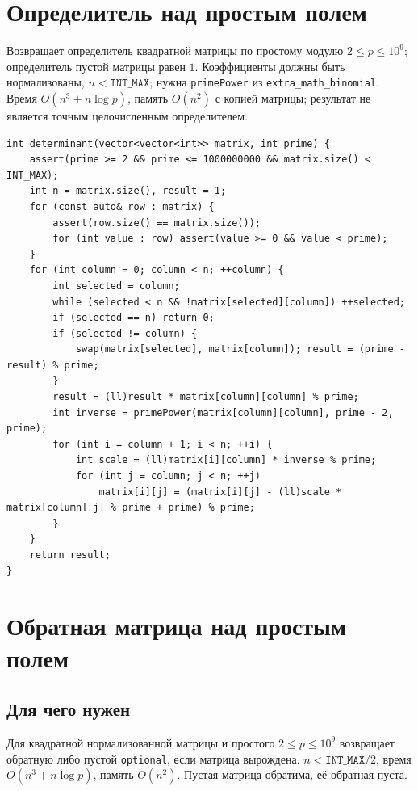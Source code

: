 \section{Определитель над простым полем}
Возвращает определитель квадратной матрицы по простому модулю $2\le p\le10^9$; определитель пустой матрицы равен $1$.
Коэффициенты должны быть нормализованы, $n<\texttt{INT\_MAX}$; нужна \texttt{primePower} из \texttt{extra\_math\_binomial}.
Время $O(n^3+n\log p)$, память $O(n^2)$ с копией матрицы; результат не является точным целочисленным определителем.
\begin{lstlisting}[name=extra_math_determinant]
int determinant(vector<vector<int>> matrix, int prime) {
    assert(prime >= 2 && prime <= 1000000000 && matrix.size() < INT_MAX);
    int n = matrix.size(), result = 1;
    for (const auto& row : matrix) {
        assert(row.size() == matrix.size());
        for (int value : row) assert(value >= 0 && value < prime);
    }
    for (int column = 0; column < n; ++column) {
        int selected = column;
        while (selected < n && !matrix[selected][column]) ++selected;
        if (selected == n) return 0;
        if (selected != column) {
            swap(matrix[selected], matrix[column]); result = (prime - result) % prime;
        }
        result = (ll)result * matrix[column][column] % prime;
        int inverse = primePower(matrix[column][column], prime - 2, prime);
        for (int i = column + 1; i < n; ++i) {
            int scale = (ll)matrix[i][column] * inverse % prime;
            for (int j = column; j < n; ++j)
                matrix[i][j] = (matrix[i][j] - (ll)scale * matrix[column][j] % prime + prime) % prime;
        }
    }
    return result;
}
\end{lstlisting}
%

\iffalse
\section{Обратная матрица над простым полем}
\subsection*{Для чего нужен}
Для квадратной нормализованной матрицы и простого $2\le p\le10^9$
возвращает обратную либо пустой \texttt{optional}, если матрица вырождена.
$n<\texttt{INT\_MAX}/2$, время $O(n^3+n\log p)$, память $O(n^2)$.
Пустая матрица обратима, её обратная пуста.
